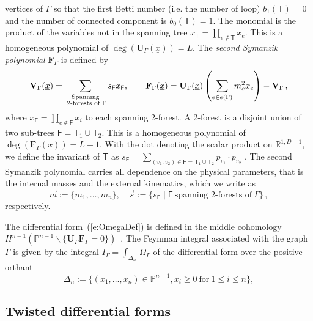 \documentclass[a4paper,12pt]{article}
\numberwithin{equation}{section}
\numberwithin{figure}{section}
\begin{document}
vertices of $\Gamma$ so that the first Betti number (i.e. the number
of loop) $b_1(\mathsf{T}) =0$ and the number of connected component
is 
$b_0(\mathsf{T})=1$. The
monomial is the product of the variables not in the spanning tree
$x_{\mathsf{T}} = \prod_{e\notin {\mathsf{T}}} x_e$.  This is a
homogeneous polynomial of 
$\deg(\textbf{U}_\Gamma(\underline x))=L$.
The {\em second 
	Symanzik polynomial}  $\textbf{F}_\Gamma$ is defined by
\begin{equation}\label{e:VFdef}
	{\bf V}_{\Gamma} (\underline x)= \sum_{\substack{ \text{Spanning} \\ \text{ 2-forests
				of } \Gamma}}s_{\mathsf{F}} x_{\mathsf{F}}
	,\qquad {\bf F}_{\Gamma}(\underline x) = {\bf
		U}_\Gamma(\underline x)\left( \sum_{e \in e(\Gamma)} m_e^2 x_e\right) - {\bf V}_{\Gamma}\,,
\end{equation}
where $x_{\mathsf{F}} =
\prod_{e \notin \mathsf{F}} x_i$ to each spanning 2-forest. A 2-forest
is a disjoint union of two sub-trees $\mathsf{F}=\mathsf{T}_1\cup \mathsf{T}_2$. 
This is a homogeneous polynomial of  
$\deg(\textbf{F}_\Gamma(\underline x))=L+1$.
With the dot denoting the scalar product on $\mathbb R^{1,D-1}$,  we define the invariant of $\mathsf T$ as $s_\mathsf{F} = \sum_{(v_1,v_2) \in \mathsf{F}=\mathsf{T}_1\cup \mathsf{T}_2} p_{v_1}\cdot p_{v_2}$ .
The second Symanzik polynomial carries all dependence on the physical parameters, that is 
the
internal masses and the external kinematics, which we  write as 
\begin{equation}
	\vec m:=\{m_1,\dots,m_n\}, \quad  \vec s:=\{s_\textsf{F} \mid \textsf{F} ~ \textrm{spanning
		2-forests of}~\Gamma\}\, ,	
\end{equation}
respectively.



The differential form~(\ref{e:OmegaDef}) is defined in the middle cohomology $H^{n-1}(\mathbb P^{n-1}\backslash
\{\textbf{U}_\Gamma \textbf{F}_\Gamma=0\})$~\cite{bek,Brown:2009ta}.
The Feynman integral associated with the graph $\Gamma$ is 
given by the integral $  I_\Gamma = \int_{\Delta_n}
\, \Omega_\Gamma$ of the  differential form over
the positive orthant
\begin{equation}\label{e:Deltan}
	\Delta_n:=\{(x_1,\dots,x_n)\in \mathbb P^{n-1}, x_i \geq0 ~\textrm{for}~ 1\leq
	i\leq n\},
\end{equation}

\subsection{Twisted differential forms}\label{sec:Twisted}
\end{document}
